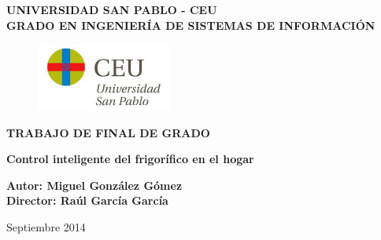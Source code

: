 \begin{titlepage}
\pagestyle{plain} %
\begin{center}
        \Large
        \vspace{1cm}
        \bfseries\textbf{UNIVERSIDAD SAN PABLO - CEU\\}
        \vspace{1cm}
        \large
        \textsf{GRADO EN INGENIERÍA DE SISTEMAS DE INFORMACIÓN\\}
        \vspace{3cm}

        \begin{figure}[htbp]
            \centering
                \includegraphics[width=0.40\textwidth]{CEU_Universidad_San_Pablo.jpg}
            \label{fig:logoceu}
        \end{figure}

        \large
        \vspace*{2cm}
        \bfseries\textbf{TRABAJO DE FINAL DE GRADO\\}

        \Large
        \vspace*{1.5cm}
        \bfseries\textbf{Control inteligente del frigorífico en el hogar}
        \vspace{1cm}

        \large
        \bfseries\textbf{Autor: Miguel González Gómez\\
        Director: Raúl García García}
        \vspace{1.5cm}


        \mdseries\textsf{Septiembre 2014}
    \end{center}
\end{titlepage}
